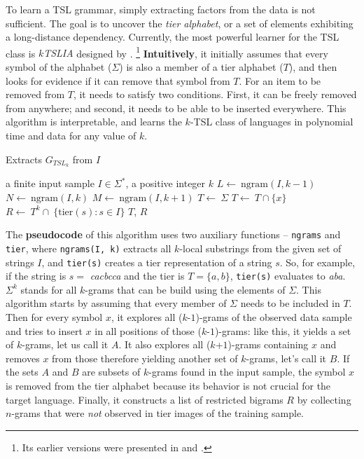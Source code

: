 To learn a TSL grammar, simply extracting factors from the data is not sufficient.
The goal is to uncover the \emph{tier alphabet}, or a set of elements exhibiting a long-distance dependency.
Currently, the most powerful learner for the TSL class is \emph{$k$TSLIA} designed by \cite{JardineMcMullin2017}.%
\footnote{Its earlier versions were presented in \citep{Jardine2016lrn} and \citep{Jardine-Heinz-2016-LTSLL}.}
\textbf{Intuitively}, it initially assumes that every symbol of the alphabet ($\Sigma$) is also a member of a tier alphabet ($T$), and then looks for evidence if it can remove that symbol from $T$.
For an item to be removed from $T$, it needs to satisfy two conditions.
First, it can be freely removed from anywhere; and second, it needs to be able to be inserted everywhere.
This algorithm is interpretable, and learns the $k$-TSL class of languages in polynomial time and data for any value of $k$.

\begin{algorithm}[h!]
\caption{Extracts $G_{TSL_{k}}$ from $I$}
\begin{algorithmic}
\REQUIRE a finite input sample $I \in \Sigma^*$, a positive integer $k$
\STATE $L \leftarrow~ \textrm{ngram}(I, k-1)$
\STATE $N \leftarrow~ \textrm{ngram}(I, k)$
\STATE $M \leftarrow~ \textrm{ngram}(I, k+1)$
\STATE $T \leftarrow~ \Sigma$
	     \STATE $T \leftarrow~ T \cap \{x\}$
	\ENDIF
\ENDFOR
\STATE $R \leftarrow~ T^k \cap~ \{\textrm{tier}(s) : s \in I\}$
\RETURN $T$, $R$
\end{algorithmic}
\end{algorithm}

The \textbf{pseudocode} of this algorithm uses two auxiliary functions -- \texttt{ngrams} and \texttt{tier}, where \texttt{ngrams(I, k)} extracts all $k$-local substrings from the given set of strings $I$, and \texttt{tier(s)} creates a tier representation of a string $s$.
So, for example, if the string is $s =$ \emph{cacbcca} and the tier is $T = \{a, b\}$,  \texttt{tier(s)} evaluates to \emph{aba}.
$\Sigma^k$ stands for all $k$-grams that can be build using the elements of $\Sigma$.
This algorithm starts by assuming that every member of $\Sigma$ needs to be included in $T$.
Then for every symbol $x$, it explores all ($k$-$1$)-grams of the observed data sample and tries to insert $x$ in all positions of those ($k$-$1$)-grams: like this, it yields a set of $k$-grams, let us call it $A$.
It also explores all ($k$+$1$)-grams containing $x$ and removes $x$ from those therefore yielding another set of $k$-grams, let's call it $B$.
If the sets $A$ and $B$ are subsets of $k$-grams found in the input sample, the symbol $x$ is removed from the tier alphabet because its behavior is not crucial for the target language.
Finally, it constructs a list of restricted bigrams $R$ by collecting $n$-grams that were \emph{not} observed in tier images of the training sample.


